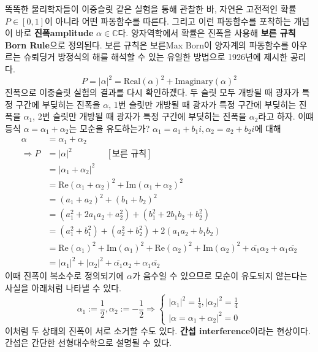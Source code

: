 \documentclass[a4paper,chapter,atbegshi]{oblivoir}
\begin{document}
똑똑한 물리학자들이 이중슬릿 같은 실험을 통해 관찰한 바, 자연은 고전적인 확률
$P\in[0,1]$이 아니라 어떤 파동함수를 따른다. 그리고 이런 파동함수를 포착하는 
개념이 바로 \textbf{진폭\tiny amplitude} $\alpha\in\mathbb{C}$다. 양자역학에서
확률은 진폭을 사용해 \textbf{보른 규칙\tiny Born Rule}으로 정의된다. 보른 규칙은
보른{\tiny Max Born}이 양자계의 파동함수를 아우르는 슈뢰딩거 방정식의
해를 해석할 수 있는 유일한 방법으로 1926년에 제시한 공리다.
\begin{equation}\label{eq:11}
  P = |\alpha|^2 = \textrm{Real}(\alpha)^2+\textrm{Imaginary}(\alpha)^2
\end{equation}
진폭으로 이중슬릿 실험의 결과를 다시 확인하겠다. 두 슬릿 모두 개방될 때 광자가
특정 구간에 부딪히는 진폭을 $\alpha$, 1번 슬릿만 개방될 때 광자가 특정 구간에
부딪히는 진폭을 $\alpha_1$, 2번 슬릿만 개방될 때 광자가 특정 구간에
부딪히는 진폭을 $\alpha_2$라고 하자. 이떄 등식 $\alpha=\alpha_1+\alpha_2$는 모순을
유도하는가? $\alpha_1=a_1+b_1i, \alpha_2=a_2+b_2i$에 대해
\begin{align*}
  \alpha &= \alpha_1 + \alpha_2 \\
  \Rightarrow  P &= |\alpha|^2 \quad\quad\quad\quad[\textrm{보른 규칙}]\\ 
      &= |\alpha_1+\alpha_2|^2\\
      &= \textrm{Re}(\alpha_1+\alpha_2)^2+\textrm{Im}(\alpha_1+\alpha_2)^2\\
      &= (a_1+a_2)^2+(b_1+b_2)^2 \\
      &= (a_1^2+2a_1a_2+a_2^2)+(b_1^2+2b_1b_2+b_2^2) \\
      &= (a_1^2+b_1^2)+(a_2^2+b_2^2)+2(a_1a_2+b_1b_2)\\
      &= \textrm{Re}(\alpha_1)^2+\textrm{Im}(\alpha_1)^2+
      \textrm{Re}(\alpha_2)^2+\textrm{Im}(\alpha_2)^2+\overline{\alpha_1}\alpha_2+
      \alpha_1\overline{\alpha_2}\\
      &=|\alpha_1|^2+|\alpha_2|^2+\overline{\alpha_1}\alpha_2+
          \alpha_1\overline{\alpha_2} 
\end{align*}
이때 진폭이 복소수로 정의되기에 $\alpha$가 음수일 수 있으므로 모순이 유도되지
않는다는 사실을 아래처럼 나타낼 수 있다.
\[
  \alpha_1 := \frac{1}{2}, \alpha_2 := -\frac{1}{2} \Rightarrow
  \begin{cases}
    |\alpha_1|^2 = \frac{1}{4}, |\alpha_2|^2=\frac{1}{4} \\
              |\alpha=\alpha_1+\alpha_2|^2=0
  \end{cases}
\]
이처럼 두 상태의 진폭이 서로 소거할 수도 있다. \textbf{간섭\tiny
interference}이라는 현상이다. 간섭은 간단한 선형대수학으로 설명될 수 있다.
\end{document}
